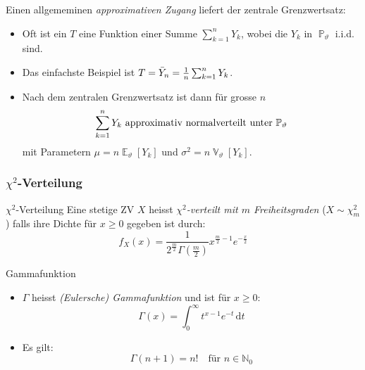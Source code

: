 \documentclass[a4paper,10pt]{article}
\def\N{\mathbb{N}}
\renewcommand{\P}{\operatorname{\mathbb{P}}}
\DeclareMathOperator{\E}{\mathbb{E}}
\DeclareMathOperator{\V}{\mathbb{V}}
\numberwithin{equation}{section}
\begin{document}
Einen allgememinen \emph{approximativen Zugang} liefert der zentrale Grenzwertsatz:
\begin{itemize}
    \item Oft ist ein \( T \) eine Funktion einer Summe \( \sum_{k = 1}^n Y_k \), wobei die \( Y_k \) in \( \P_\vartheta \) i.i.d. sind.
    \item Das einfachste Beispiel ist \( T = \Bar{Y}_n = \frac{1}{n} \sum_{k = 1}^n Y_k \).
    \item Nach dem zentralen Grenzwertsatz ist dann für grosse \( n \)
    \[
        \sum_{k = 1}^n Y_k \text{ approximativ normalverteilt unter \( \P_\vartheta \)}
    \]
    mit Parametern \( \mu = n \E_\vartheta[Y_k] \) und \( \sigma^2 = n \V_\vartheta[Y_k] \).
\end{itemize}

\subsubsection{\( \chi^2 \)-Verteilung}

\begin{mainbox}{\( \chi^2 \)-Verteilung}
    Eine stetige ZV \( X \) heisst \emph{\( \chi^2 \)-verteilt mit \( m \) Freiheitsgraden} (\( X \sim \chi^2_m \)) falls ihre Dichte für \( x \geq 0 \) gegeben ist durch:
    \[
        f_X(x) = \frac{1}{2^\frac{m}{2} \Gamma\left(\frac{m}{2}\right)} x^{\frac{m}{2} - 1} e^{-\frac{x}{2}}
    \]
\end{mainbox}

\begin{subbox}{Gammafunktion}
    \begin{itemize}
        \item \( \Gamma \) heisst \emph{(Eulersche) Gammafunktion} und ist für \( x \geq 0 \):
        \[
            \Gamma(x) = \int_0^\infty t^{x - 1} e^{-t} \, \mathrm{d}t
        \]
        \item Es gilt:
        \[
            \Gamma(n + 1) = n! \quad \text{für } n \in \N_0
        \]
    \end{itemize}
\end{subbox}
\end{document}
